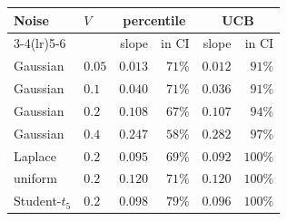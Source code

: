 \begin{tabular}{llrrrr}
\toprule
Noise & $V$ & \multicolumn{2}{c}{percentile} & \multicolumn{2}{c}{UCB}\\
\cmidrule(lr){3-4}\cmidrule(lr){5-6}
 & & slope & in CI & slope & in CI\\
\midrule
Gaussian & $0.05$ & $0.013$ & $71\%$ & $0.012$ & $91\%$\\
Gaussian & $0.1$ & $0.040$ & $71\%$ & $0.036$ & $91\%$\\
Gaussian & $0.2$ & $0.108$ & $67\%$ & $0.107$ & $94\%$\\
Gaussian & $0.4$ & $0.247$ & $58\%$ & $0.282$ & $97\%$\\
Laplace & $0.2$ & $0.095$ & $69\%$ & $0.092$ & $100\%$\\
uniform & $0.2$ & $0.120$ & $71\%$ & $0.120$ & $100\%$\\
Student-$t_5$ & $0.2$ & $0.098$ & $79\%$ & $0.096$ & $100\%$\\
\bottomrule
\end{tabular}
